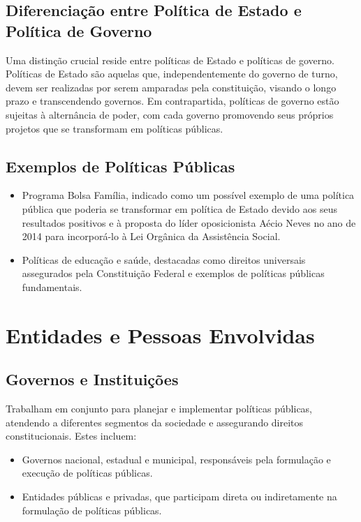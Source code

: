 \documentclass[
   article,       
   12pt,          
   oneside,       
   a4paper,       
   english,       
   brazil,        
   sumario=tradicional
   ]{abntex2}
\begin{document}
\subsection{Diferenciação entre Política de Estado e Política de Governo}
Uma distinção crucial reside entre políticas de Estado e políticas de governo. Políticas de Estado são aquelas que, independentemente do governo de turno, devem ser realizadas por serem amparadas pela constituição, visando o longo prazo e transcendendo governos. Em contrapartida, políticas de governo estão sujeitas à alternância de poder, com cada governo promovendo seus próprios projetos que se transformam em políticas públicas.

\subsection{Exemplos de Políticas Públicas}
\begin{itemize}
    \item Programa Bolsa Família, indicado como um possível exemplo de uma política pública que poderia se transformar em política de Estado devido aos seus resultados positivos e à proposta do líder oposicionista Aécio Neves no ano de 2014 para incorporá-lo à Lei Orgânica da Assistência Social.
    \item Políticas de educação e saúde, destacadas como direitos universais assegurados pela Constituição Federal e exemplos de políticas públicas fundamentais.
\end{itemize}

\section{Entidades e Pessoas Envolvidas}
\subsection{Governos e Instituições}
Trabalham em conjunto para planejar e implementar políticas públicas, atendendo a diferentes segmentos da sociedade e assegurando direitos constitucionais. Estes incluem:
\begin{itemize}
    \item Governos nacional, estadual e municipal, responsáveis pela formulação e execução de políticas públicas.
    \item Entidades públicas e privadas, que participam direta ou indiretamente na formulação de políticas públicas.
\end{itemize}
\end{document}
